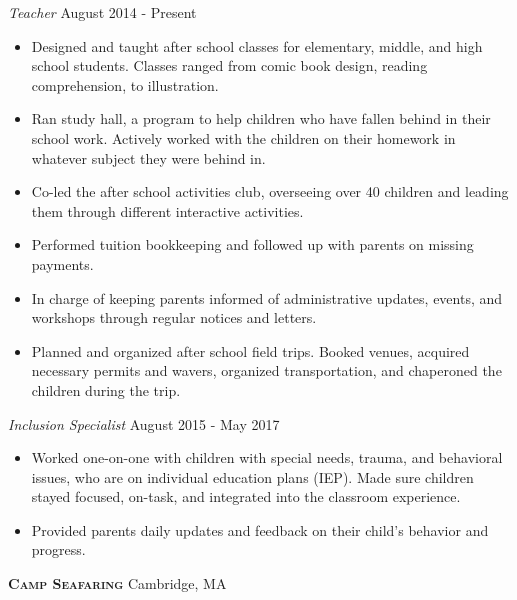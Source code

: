 \documentclass[a4paper]{article}
\begin{document}
\begin{addmargin}[1em]{0em}
    \textit{Teacher} \hfill August 2014 - Present\\
    \vspace{-1mm}
    \begin{itemize} \itemsep 1pt
        \item Designed and taught after school classes for elementary, middle, and high 
            school students. Classes ranged from comic book design, reading comprehension,
            to illustration.
        \item Ran study hall, a program to help children who have fallen behind in their
            school work. Actively worked with the children on their homework in whatever
            subject they were behind in.
        \item Co-led the after school activities club, overseeing over 40 children and leading
            them through different interactive activities.
        \item Performed tuition bookkeeping and followed up with parents on
            missing payments.
        \item In charge of keeping parents informed of administrative updates, events,
            and workshops through regular notices and letters.
        \item Planned and organized after school field trips. Booked venues, acquired 
            necessary permits and wavers, organized transportation, and chaperoned the
            children during the trip.
        
        
    \end{itemize}
    \textit{Inclusion Specialist} \hfill August 2015 - May 2017\\
    \vspace{-1mm}
    \begin{itemize} \itemsep 1pt
        \item Worked one-on-one with children with special needs, trauma, and behavioral
            issues, who are on individual education plans (IEP). Made sure children stayed
            focused, on-task, and integrated into the classroom experience.
        \item Provided parents daily updates and feedback on their child's behavior and
            progress.

    \end{itemize}
\end{addmargin}

\textbf{\textsc{Camp Seafaring}} \hfill Cambridge, MA\\
\vspace{2mm}
\end{document}

